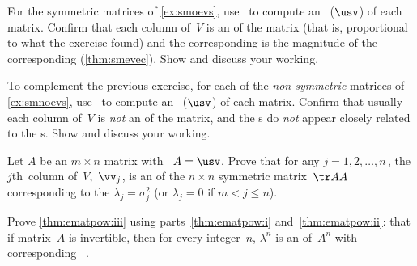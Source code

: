 \begin{exercise}  
For the symmetric matrices of \autoref{ex:smoevs}, use \script\ to compute an \svd\ (\(\usv\)) of each matrix.
Confirm that each column of~\(V\) is an  of the matrix (that is, proportional to what the exercise found) and the corresponding  is the magnitude of the corresponding  (\autoref{thm:smevec}).
Show and discuss your working.
\end{exercise}




\begin{exercise}  
To complement the previous exercise, for each of the \emph{non-symmetric} matrices of \autoref{ex:smnoevs}, use \script\ to compute an \svd\ (\(\usv\)) of each matrix.
Confirm that usually each column of~\(V\) is \emph{not} an  of the matrix, and the s do \emph{not} appear closely related to the s.
Show and discuss your working.
\end{exercise}











\begin{exercise}  
Let \(A\) be an \(m\times n\)  matrix with \svd\ \(A=\usv\).
Prove that for any \(j=1,2,\ldots,n\)\,, the \(j\)th~column of~\(V\),~\(\vv_j\), is an  of the \(n\times n\) {symmetric matrix}~\(\tr AA\) corresponding to the  \(\lambda_j=\sigma_j^2\) (or \(\lambda_j=0\) if \(m<j\leq n\)).
\end{exercise}



\begin{exercise} \label{ex:ematpow:iii} 
Prove \autoref{thm:ematpow:iii} using parts~\ref{thm:ematpow:i} 
and~\ref{thm:ematpow:ii}: that if matrix~\(A\) is {invertible}, then 
for every integer~\(n\), \(\lambda^n\) is an  
of~\(A^n\) with corresponding ~\xv.
\end{exercise}





